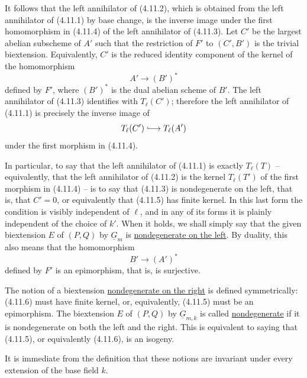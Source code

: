 It follows that the left annihilator of (4.11.2), which is obtained
from the left annihilator of (4.11.1) by base change, is the inverse
image under the first homomorphism in (4.11.4) of the left
annihilator of (4.11.3).  Let $C'$ be the largest abelian subscheme
of $A'$ such that the restriction of $F'$ to $(C',B')$ is the
trivial biextension.  Equivalently, $C'$ is the reduced identity
component of the kernel of the homomorphism
\begin{equation}\tag{4.11.5}
 A'\longrightarrow (B')^*
\end{equation}
defined by $F'$, where $(B')^*$ is the dual abelian scheme of $B'$.
The left annihilator of (4.11.3) identifies with $T_\ell(C')$;
therefore the left annihilator of (4.11.1) is precisely the inverse
image of
\[
 T_\ell(C')\lhook\joinrel\longrightarrow T_\ell(A')
\]
under the first morphism in (4.11.4).

In particular, to say that the left annihilator of (4.11.1) is
exactly $T_\ell(T)$ -- equivalently, that the left annihilator of
(4.11.2) is the kernel $T_\ell(T')$ of the first morphism in
(4.11.4) -- is to say that (4.11.3) is nondegenerate on the left,
that is, that $C'=0$, or equivalently that (4.11.5) has finite
kernel.  In this last form the condition is visibly independent of
$\ell$, and in any of its forms it is plainly independent of the
choice of $k'$.  When it holds, we shall simply say that the given
biextension $E$ of $(P,Q)$ by $\underline G_m$ is
\underline{nondegenerate on the left}.  By duality, this also means
that the homomorphism
\begin{equation}\tag{4.11.6}
 B'\longrightarrow (A')^*
\end{equation}
defined by $F'$ is an epimorphism, that is, is surjective.

The notion of a biextension \underline{nondegenerate on the right}
is defined symmetrically: (4.11.6) must have finite kernel, or,
equivalently, (4.11.5) must be an epimorphism.  The biextension $E$
of $(P,Q)$ by $\underline G_{m,k}$ is called
\underline{nondegenerate} if it is nondegenerate on both the left
and the right.  This is equivalent to saying that (4.11.5), or
equivalently (4.11.6), is an isogeny.

It is immediate from the definition that these notions are
invariant under every extension of the base field $k$.
